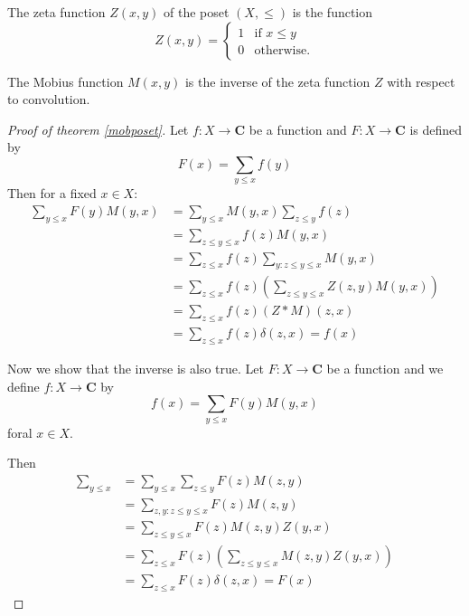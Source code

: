 \begin{definition}
The zeta function $Z(x,y)$ of the poset $(X,\le)$ is the function
$$
Z(x,y)=\begin{cases}
1 & \text{if }x\le y \\
0 & \text{otherwise}.
\end{cases}
$$

The Mobius function $M(x,y)$ is the inverse of the zeta function $Z$ with respect to convolution.
\end{definition}
\begin{proof}[Proof of theorem \ref{mobposet}]
Let $f:X\to \mathbf{C}$ be a function and $F:X\to \mathbf{C}$ is defined by 
$$
F(x)=\sum _{y\le x}f(y)
$$
Then for a fixed $x \in X$:
\begin{align*}
\sum _{y\le x}F(y)M(y,x) & =\sum _{y\le x}M(y,x)\sum _{z\le y}f(z) \\
 & =\sum _{z\le y \le x}f(z)M(y,x) \\
 & =\sum _{z\le x}f(z)\sum _{y:z\le y \le x}M(y,x) \\
 & =\sum _{z \le x}f(z)\left( \sum _{z\le y\le x} Z(z,y)M(y,x) \right) \\
 & =\sum _{z\le x}f(z)(Z*M)(z,x) \\
 & =\sum _{z\le x}f(z)\delta(z,x)=f(x)
\end{align*}

Now we show that the inverse is also true. Let $F:X\to \mathbf{C}$ be a function and we define $f:X\to \mathbf{C}$ by
$$
f(x)=\sum _{y\le x} F(y)M(y,x)
$$
foral $x \in X$.

Then
\begin{align*}
\sum _{y\le x} & =\sum _{y\le x}\sum _{z \le y}F(z)M(z,y) \\
 & =\sum _{z,y:z\le y\le x}F(z)M(z,y) \\
 & =\sum _{z\le y\le x}F(z)M(z,y)Z(y,x) \\
 & =\sum _{z\le x}F(z)\left( \sum _{z\le y \le x}M(z,y)Z(y,x) \right) \\
 & =\sum _{z\le x}F(z)\delta(z,x)=F(x)
\end{align*}
\end{proof}

